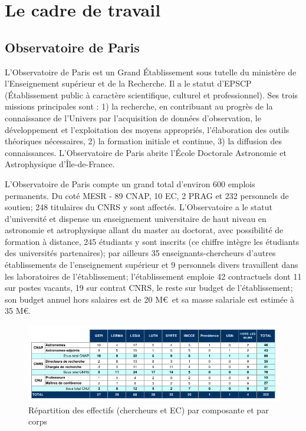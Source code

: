 \section{Le cadre de travail}


\subsection{Observatoire de Paris}

L’Observatoire de Paris est un Grand Établissement sous tutelle du ministère de l’Enseignement supérieur et de la Recherche. Il a le statut d’EPSCP (Établissement public à caractère scientifique, culturel et professionnel). Ses trois missions principales sont : 1) la recherche, en contribuant au progrès de la connaissance de l’Univers par l’acquisition de données d’observation, le développement et l’exploitation des moyens appropriés, l’élaboration des outils théoriques nécessaires, 2) la formation initiale et continue, 3) la diffusion des connaissances. L’Observatoire de Paris abrite l’École Doctorale Astronomie et Astrophysique d’Île-de-France.

L’Observatoire de Paris compte un grand total d'environ 600 emplois permanents. Du coté MESR - 89 CNAP, 10 EC, 2 PRAG et 232 personnels de soutien; 248 titulaires du CNRS y sont affectés. L’Observatoire a le statut d'université et dispense un enseignement universitaire de haut niveau en astronomie et astrophysique allant du master au doctorat, avec possibilité de formation à distance, 245 étudiants y sont inscrits (ce chiffre intègre les étudiants des universités partenaires); par ailleurs 35 enseignants-chercheurs d’autres établissements de l’enseignement supérieur et 9 personnels divers travaillent dans les laboratoires de l’établissement; l’établissement emploie 42 contractuels dont 11 sur postes vacants, 19 sur contrat CNRS, le reste sur budget de l’établissement; son budget annuel hors salaires est de 20 M\euro\ et sa masse salariale est estimée à 35 M\euro.

\begin{figure}[!ht]
    \centerline{
    	\includegraphics[width=1.3\textwidth]{./images/repartition_effectif.png}
    	}
    \caption{Répartition des effectifs (chercheurs et EC) par composante et par corps}
    \label{repartition_effectif}
\end{figure}

